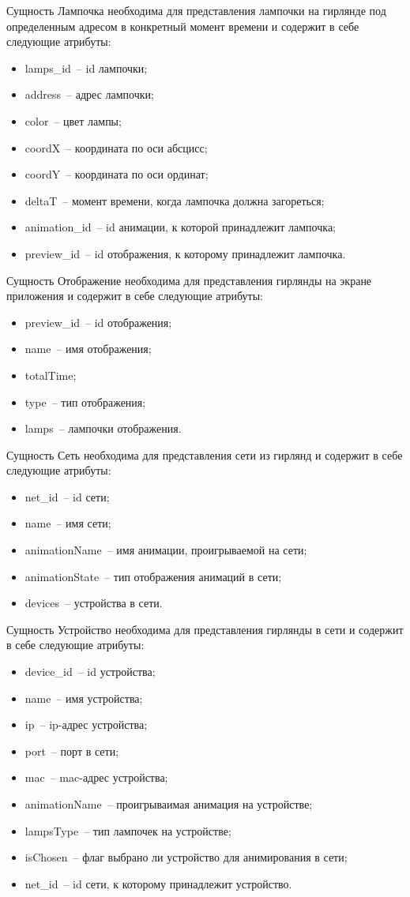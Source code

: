 Сущность Лампочка необходима для представления лампочки на гирлянде под определенным адресом в конкретный момент времени и содержит в себе следующие атрибуты:
\begin{itemize}
	\item lamps\_id~-- id лампочки;
	\item address~-- адрес лампочки;
	\item color~-- цвет лампы;
	\item coordX~-- координата по оси абсцисс;
	\item coordY~-- координата по оси ординат;
	\item deltaT~-- момент времени, когда лампочка должна загореться;
	\item animation\_id~-- id анимации, к которой принадлежит лампочка;
	\item preview\_id~-- id отображения, к которому принадлежит лампочка.
\end{itemize}

Сущность Отображение необходима для представления гирлянды на экране приложения и содержит в себе следующие атрибуты:
\begin{itemize}
	\item preview\_id~-- id отображения;
	\item name~-- имя отображения;
	\item totalTime;
	\item type~-- тип отображения;
	\item lamps~-- лампочки отображения.
\end{itemize}

Сущность Сеть необходима для представления сети из гирлянд и содержит в себе следующие атрибуты:
\begin{itemize}
	\item net\_id~-- id сети;
	\item name~-- имя сети;
	\item animationName~-- имя анимации, проигрываемой на сети;
	\item animationState~-- тип отображения анимаций в сети;
	\item devices~-- устройства в сети.
\end{itemize}

Сущность Устройство необходима для представления гирлянды в сети и содержит в себе следующие атрибуты:
\begin{itemize}
	\item device\_id~-- id устройства;
	\item name~-- имя устройства;
	\item ip~-- ip-адрес устройства;
	\item port~-- порт в сети;
	\item mac~-- mac-адрес устройства;
	\item animationName~-- проигрываимая анимация на устройстве;
	\item lampsType~-- тип лампочек на устройстве;
	\item isChosen~-- флаг выбрано ли устройство для анимирования в сети;
	\item net\_id~-- id сети, к которому принадлежит устройство.
\end{itemize}

